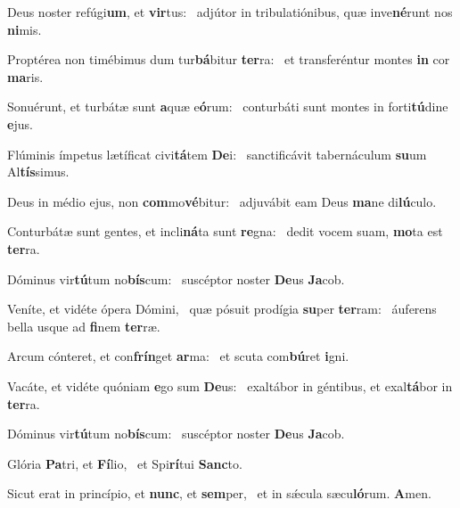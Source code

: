 \item Deus noster refúgi\textbf{um}, et \textbf{vir}tus:~\psstar{} adjútor in tribulatiónibus, quæ inve\textbf{né}runt nos \textbf{ni}mis.
\item Proptérea non timébimus dum tur\textbf{bá}bitur \textbf{ter}ra:~\psstar{} et transferéntur montes \textbf{in} cor \textbf{ma}ris.
\item Sonuérunt, et turbátæ sunt \textbf{a}quæ e\textbf{ó}rum:~\psstar{} conturbáti sunt montes in forti\textbf{tú}dine \textbf{e}jus.
\item Flúminis ímpetus lætíficat civi\textbf{tá}tem \textbf{De}i:~\psstar{} sanctificávit tabernáculum \textbf{su}um Al\textbf{tís}simus.
\item Deus in médio ejus, non \textbf{com}mo\textbf{vé}bitur:~\psstar{} adjuvábit eam Deus \textbf{ma}ne di\textbf{lú}culo.
\item Conturbátæ sunt gentes, et incli\textbf{ná}ta sunt \textbf{re}gna:~\psstar{} dedit vocem suam, \textbf{mo}ta est \textbf{ter}ra.
\item Dóminus vir\textbf{tú}tum no\textbf{bís}\-cum:~\psstar{} suscéptor noster \textbf{De}us \textbf{Ja}cob.
\item Veníte, et vidéte ópera Dómini,~\pscross{} quæ pósuit prodígia \textbf{su}per \textbf{ter}ram:~\psstar{} áuferens bella usque ad \textbf{fi}nem \textbf{ter}ræ.
\item Arcum cónteret, et con\textbf{frín}get \textbf{ar}ma:~\psstar{} et scuta com\textbf{bú}ret \textbf{i}gni.
\item Vacáte, et vidéte quóniam \textbf{e}go sum \textbf{De}us:~\psstar{} exaltábor in géntibus, et exal\textbf{tá}bor in \textbf{ter}ra.
\item Dóminus vir\textbf{tú}tum no\textbf{bís}\-cum:~\psstar{} suscéptor noster \textbf{De}us \textbf{Ja}cob.
\item Glória \textbf{Pa}tri, et \textbf{Fí}lio,~\psstar{} et Spi\textbf{rí}tui \textbf{Sanc}to.
\item Sicut erat in princípio, et \textbf{nunc}, et \textbf{sem}per,~\psstar{} et in sǽcula sæcu\textbf{ló}rum. \textbf{A}men.
